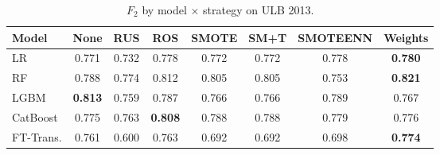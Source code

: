\begin{table}[ht!]
\centering
\caption{$F_2$ by model $\times$ strategy on ULB 2013.}
\label{tab:factorial_ulb_f2}
\begin{tabular}{l c c c c c c c}
\toprule
Model & None & RUS & ROS & SMOTE & SM+T & SMOTEENN & Weights \\
\midrule
LR         & 0.771 & 0.732 & 0.778 & 0.772 & 0.772 & 0.778 & \textbf{0.780} \\
RF         & 0.788 & 0.774 & 0.812 & 0.805 & 0.805 & 0.753 & \textbf{0.821} \\
LGBM       & \textbf{0.813} & 0.759 & 0.787 & 0.766 & 0.766 & 0.789 & 0.767 \\
CatBoost   & 0.775 & 0.763 & \textbf{0.808} & 0.788 & 0.788 & 0.779 & 0.776 \\
FT-Trans.  & 0.761 & 0.600 & 0.763 & 0.692 & 0.692 & 0.698 & \textbf{0.774} \\
\bottomrule
\end{tabular}
\end{table}